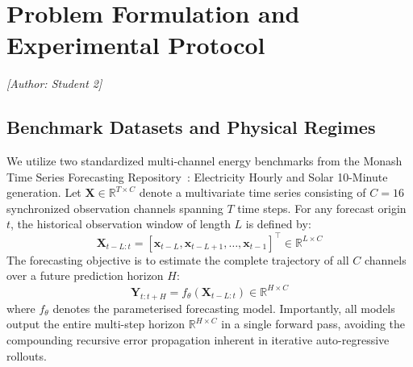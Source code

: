 \documentclass[11pt,a4paper]{article}
\begin{document}
\section{Problem Formulation and Experimental Protocol}
\label{sec:formulation}
\noindent\textit{[Author: Student 2]}

\subsection{Benchmark Datasets and Physical Regimes}
We utilize two standardized multi-channel energy benchmarks from the Monash Time Series Forecasting Repository~\cite{godahewa2021monash}: Electricity Hourly and Solar 10-Minute generation.
Let $\mathbf{X} \in \mathbb{R}^{T \times C}$ denote a multivariate time series consisting of $C=16$ synchronized observation channels spanning $T$ time steps. For any forecast origin $t$, the historical observation window of length $L$ is defined by:
\begin{equation}
    \mathbf{X}_{t-L:t} = \left[ \mathbf{x}_{t-L}, \mathbf{x}_{t-L+1}, \dots, \mathbf{x}_{t-1} \right]^\top \in \mathbb{R}^{L \times C}
\end{equation}
The forecasting objective is to estimate the complete trajectory of all $C$ channels over a future prediction horizon $H$:
\begin{equation}
    \hat{\mathbf{Y}}_{t:t+H} = f_\theta\left(\mathbf{X}_{t-L:t}\right) \in \mathbb{R}^{H \times C}
\end{equation}
where $f_\theta$ denotes the parameterised forecasting model. Importantly, all models output the entire multi-step horizon $\mathbb{R}^{H \times C}$ in a single forward pass, avoiding the compounding recursive error propagation inherent in iterative auto-regressive rollouts.

\begin{table}[t]
\centering
\small
\caption{Benchmark Dataset Specifications and Experimental Window Configurations.}
\label{tab:dataset_specs}
\end{table}
\end{document}
